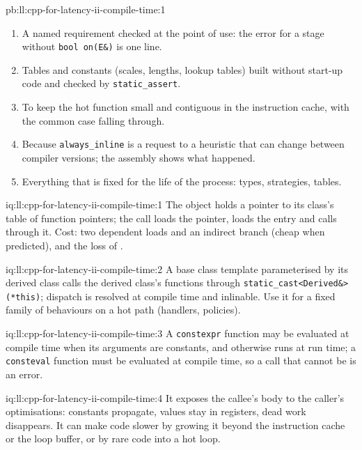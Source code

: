 \begin{solution}{pb:ll:cpp-for-latency-ii-compile-time:1}
\begin{enumerate}
rebuild in a research engine).
\item A named requirement checked at the point of use: the error for a stage without \texttt{bool on(E\&)} is one line.
\item Tables and constants (scales, lengths, lookup tables) built without start-up code and checked by
\texttt{static\_assert}.
\item To keep the hot function small and contiguous in the instruction cache, with the common case falling through.
\item Because \texttt{always\_inline} is a request to a heuristic that can change between compiler versions; the assembly
shows what happened.
\item Everything that is fixed for the life of the process: types, strategies, tables.
\end{enumerate}
\end{solution}

\begin{solution}{iq:ll:cpp-for-latency-ii-compile-time:1}
The object holds a pointer to its class's table of function pointers; the call loads the pointer, loads the entry and calls
through it. Cost: two dependent loads and an indirect branch (cheap when predicted), and the loss of .
\end{solution}

\begin{solution}{iq:ll:cpp-for-latency-ii-compile-time:2}
A base class template parameterised by its derived class calls the derived class's functions through
\texttt{static\_cast<Derived\&>(*this)}; dispatch is resolved at compile time and inlinable. Use it for a fixed family of
behaviours on a hot path (handlers, policies).
\end{solution}

\begin{solution}{iq:ll:cpp-for-latency-ii-compile-time:3}
A \texttt{constexpr} function may be evaluated at compile time when its arguments are constants, and otherwise runs at run
time; a \texttt{consteval} function must be evaluated at compile time, so a call that cannot be is an error.
\end{solution}

\begin{solution}{iq:ll:cpp-for-latency-ii-compile-time:4}
It exposes the callee's body to the caller's optimisations: constants propagate, values stay in registers, dead work
disappears. It can make code slower by growing it beyond the instruction cache or the loop buffer, or by  rare code
into a hot loop.
\end{solution}

